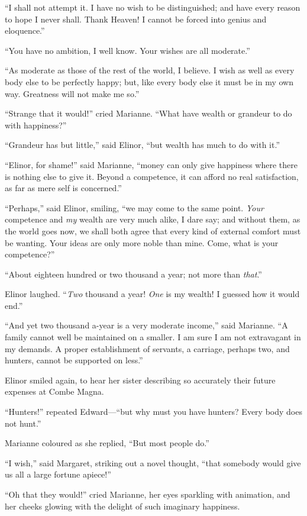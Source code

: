 \documentclass{article}
\begin{document}
``I shall not attempt it.  I have no wish to be
distinguished; and have every reason to hope I never shall.
Thank Heaven! I cannot be forced into genius and eloquence.''

``You have no ambition, I well know.  Your wishes
are all moderate.''

``As moderate as those of the rest of the world,
I believe.  I wish as well as every body else to be
perfectly happy; but, like every body else it must be
in my own way.  Greatness will not make me so.''

``Strange that it would!'' cried Marianne.  ``What have
wealth or grandeur to do with happiness?''

``Grandeur has but little,'' said Elinor, ``but wealth
has much to do with it.''

``Elinor, for shame!'' said Marianne, ``money can only
give happiness where there is nothing else to give it.
Beyond a competence, it can afford no real satisfaction,
as far as mere self is concerned.''

``Perhaps,'' said Elinor, smiling, ``we may come
to the same point.  \emph{Your} competence and \emph{my} wealth
are very much alike, I dare say; and without them,
as the world goes now, we shall both agree that every
kind of external comfort must be wanting.  Your ideas
are only more noble than mine.  Come, what is your competence?''

``About eighteen hundred or two thousand a year;
not more than \emph{that}.''

Elinor laughed.  ``\emph{Two} thousand a year! \emph{One} is my
wealth! I guessed how it would end.''

``And yet two thousand a-year is a very moderate income,''
said Marianne.  ``A family cannot well be maintained on
a smaller.  I am sure I am not extravagant in my demands.
A proper establishment of servants, a carriage, perhaps two,
and hunters, cannot be supported on less.''

Elinor smiled again, to hear her sister describing
so accurately their future expenses at Combe Magna.

``Hunters!'' repeated Edward---``but why must you have
hunters?  Every body does not hunt.''

Marianne coloured as she replied, ``But most people do.''

``I wish,'' said Margaret, striking out a novel thought,
``that somebody would give us all a large fortune apiece!''

``Oh that they would!'' cried Marianne, her eyes
sparkling with animation, and her cheeks glowing
with the delight of such imaginary happiness.
\end{document}
